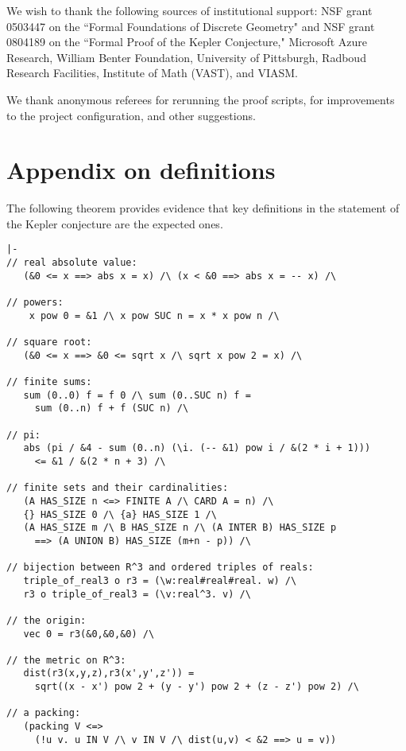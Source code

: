 We wish to thank the following sources of institutional support: NSF
grant 0503447 on the ``Formal Foundations of Discrete Geometry" and NSF
grant 0804189 on the ``Formal Proof of the Kepler Conjecture,"
Microsoft Azure Research, William Benter Foundation, University of
Pittsburgh, Radboud Research Facilities, Institute of Math (VAST), and
VIASM.

We thank anonymous referees for rerunning the proof scripts, for
improvements to the project configuration, and other suggestions.


\section{Appendix on definitions}\label{sec:ap}

The following theorem provides evidence that key definitions in the
statement of the Kepler conjecture are the expected ones.

\begin{obeylines}

\begin{verbatim}
|-  
// real absolute value:
   (&0 <= x ==> abs x = x) /\ (x < &0 ==> abs x = -- x) /\   

// powers:
    x pow 0 = &1 /\ x pow SUC n = x * x pow n /\

// square root:
   (&0 <= x ==> &0 <= sqrt x /\ sqrt x pow 2 = x) /\ 

// finite sums:
   sum (0..0) f = f 0 /\ sum (0..SUC n) f =  
     sum (0..n) f + f (SUC n) /\ 

// pi:
   abs (pi / &4 - sum (0..n) (\i. (-- &1) pow i / &(2 * i + 1))) 
     <= &1 / &(2 * n + 3) /\

// finite sets and their cardinalities:
   (A HAS_SIZE n <=> FINITE A /\ CARD A = n) /\
   {} HAS_SIZE 0 /\ {a} HAS_SIZE 1 /\ 
   (A HAS_SIZE m /\ B HAS_SIZE n /\ (A INTER B) HAS_SIZE p 
     ==> (A UNION B) HAS_SIZE (m+n - p)) /\

// bijection between R^3 and ordered triples of reals:
   triple_of_real3 o r3 = (\w:real#real#real. w) /\
   r3 o triple_of_real3 = (\v:real^3. v) /\ 

// the origin:
   vec 0 = r3(&0,&0,&0) /\

// the metric on R^3:
   dist(r3(x,y,z),r3(x',y',z')) = 
     sqrt((x - x') pow 2 + (y - y') pow 2 + (z - z') pow 2) /\

// a packing:
   (packing V <=> 
     (!u v. u IN V /\ v IN V /\ dist(u,v) < &2 ==> u = v))
\end{verbatim}

\end{obeylines}


